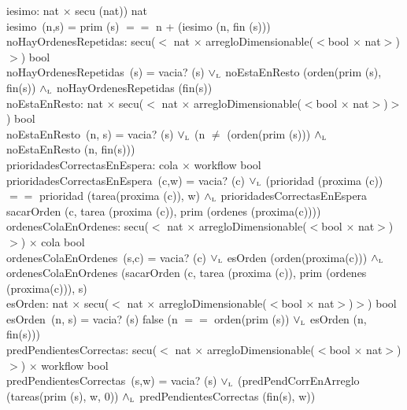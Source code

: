 \documentclass[a4paper,10pt]{article}
\begin{document}
	iesimo: nat $\times$ secu (nat)) \en nat\\
	\indent iesimo\ (n,s) =  \lif prim (s) $==$ n   + (iesimo (n, fin (s)))\\
	
	 noHayOrdenesRepetidas: secu($<$ nat $\times$ arregloDimensionable($<$bool $\times$ nat$>$)$>$) \en bool\\
	\indent noHayOrdenesRepetidas\ (s) =  vacia? (s) $\lor_{\mathrm{\scriptscriptstyle{L}}}$ noEstaEnResto (orden(prim (s), fin(s)) $\land_{\mathrm{\scriptscriptstyle{L}}}$ noHayOrdenesRepetidas (fin(s))\\
	
	 noEstaEnResto: nat $\times$ secu($<$ nat $\times$ arregloDimensionable($<$bool $\times$ nat$>$)$>$) \en bool\\
	\indent noEstaEnResto\ (n, s) =  vacia? (s) $\lor_{\mathrm{\scriptscriptstyle{L}}}$ (n $\neq$ (orden(prim (s))) $\land_{\mathrm{\scriptscriptstyle{L}}}$ noEstaEnResto (n, fin(s)))\\
	
	prioridadesCorrectasEnEspera: cola $\times$ workflow \en bool\\
	\indent prioridadesCorrectasEnEspera\ (c,w) =  vacia? (c) $\lor_{\mathrm{\scriptscriptstyle{L}}}$ (prioridad (proxima (c)) $==$ prioridad (tarea(proxima (c)), w) $\land_{\mathrm{\scriptscriptstyle{L}}}$ prioridadesCorrectasEnEspera sacarOrden (c, tarea (proxima (c)), prim (ordenes (proxima(c))))\\
	
	
	ordenesColaEnOrdenes: secu($<$ nat $\times$ arregloDimensionable($<$bool $\times$ nat$>$)$>$) $\times$ cola \en bool\\
	\indent ordenesColaEnOrdenes\ (s,c) =   vacia? (c) $\lor_{\mathrm{\scriptscriptstyle{L}}}$ esOrden (orden(proxima(c))) $\land_{\mathrm{\scriptscriptstyle{L}}}$ ordenesColaEnOrdenes (sacarOrden (c, tarea (proxima (c)), prim (ordenes (proxima(c))), s) \\
	
	esOrden: nat $\times$ secu($<$ nat $\times$ arregloDimensionable($<$bool $\times$ nat$>$)$>$) \en bool\\
	\indent esOrden\ (n, s) =  \lif vacia? (s) \lthen false \lelse (n $==$ orden(prim (s)) $\lor_{\mathrm{\scriptscriptstyle{L}}}$ esOrden (n, fin(s))) \\
	
	predPendientesCorrectas: secu($<$ nat $\times$ arregloDimensionable($<$bool $\times$ nat$>$)$>$) $\times$ workflow \en bool\\
	\indent predPendientesCorrectas\ (s,w) =  vacia? (s) $\lor_{\mathrm{\scriptscriptstyle{L}}}$ (predPendCorrEnArreglo (tareas(prim (s), w, 0)) $\land_{\mathrm{\scriptscriptstyle{L}}}$ predPendientesCorrectas (fin(s), w)) \\  
	
\end{document}
